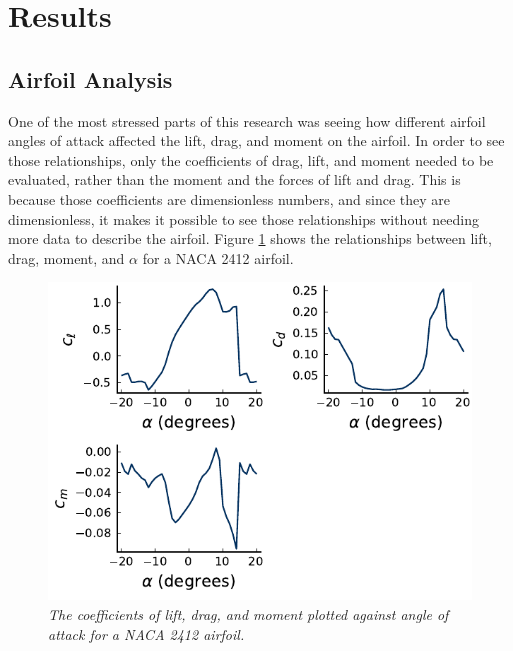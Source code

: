 \documentclass[journal]{new-aiaa}
\begin{document}
	
	
	
	
	\section{Results}
	\label{sec:results}
	
	\subsection{Airfoil Analysis}
	\label{sec:airfoil}
	
	One of the most stressed parts of this research was seeing how different airfoil angles of attack affected the lift, drag, and moment on the airfoil. In order to see those relationships, only the coefficients of drag, lift, and moment needed to be evaluated, rather than the moment and the forces of lift and drag. This is because those coefficients are dimensionless numbers, and since they are dimensionless, it makes it possible to see those relationships without needing more data to describe the airfoil. Figure \ref{fig:aoa-coefficients} shows the relationships between lift, drag, moment, and \(\alpha\) for a NACA 2412 airfoil.\\
	
	\begin{figure}[H]
		\centering
		\includegraphics{../graphics/aoa-coefficients.pdf}
		\caption{\emph{The coefficients of lift, drag, and moment plotted against angle of attack for a NACA 2412 airfoil.}}
		\label{fig:aoa-coefficients}
	\end{figure}
	
\end{document}
